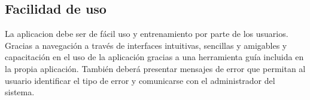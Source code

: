 \subsection{Facilidad de uso}
La aplicacion debe ser de f\'acil uso y entrenamiento por parte de los usuarios. Gracias a navegaci\'on a trav\'es de interfaces intuitivas, sencillas y amigables y capacitaci\'on en el uso de la aplicaci\'on gracias a una herramienta gu\'ia incluida en la propia aplicaci\'on.
Tambi\'en deber\'a presentar mensajes de error que permitan al usuario identificar el tipo de error y comunicarse con el administrador del sistema.
